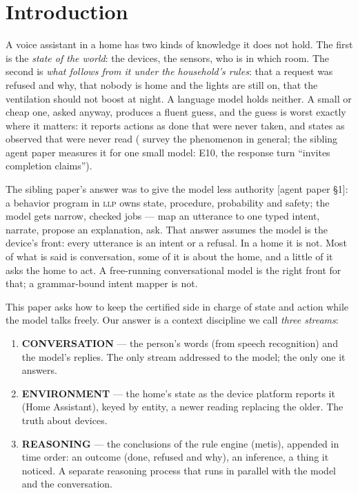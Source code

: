 \documentclass[11pt]{article}
\newcommand{\llp}{\textsc{llp}}
\newcommand{\src}[1]{{\footnotesize\textsf{[#1]}}}
\begin{document}
\section{Introduction}\label{sec:intro}

A voice assistant in a home has two kinds of knowledge it does not hold. The first is the
\emph{state of the world}: the devices, the sensors, who is in which room. The second is
\emph{what follows from it under the household's rules}: that a request was refused and why,
that nobody is home and the lights are still on, that the ventilation should not boost at
night. A language model holds neither. A small or cheap one, asked anyway, produces a
fluent guess, and the guess is worst exactly where it matters: it reports actions as done
that were never taken, and states as observed that were never read
(\cite{ji2023survey} survey the phenomenon in general; the sibling agent paper measures it
for one small model: E10, the response turn ``invites completion claims'').

The sibling paper's answer was to give the model less authority \src{agent paper
\S1}: a behavior program in \llp{} owns state, procedure, probability and safety; the model
gets narrow, checked jobs --- map an utterance to one typed intent, narrate, propose an
explanation, ask. That answer assumes the model is the device's front: every utterance is
an intent or a refusal. In a home it is not. Most of what is said is conversation, some of
it is about the home, and a little of it asks the home to act. A free-running conversational
model is the right front for that; a grammar-bound intent mapper is not.

This paper asks how to keep the certified side in charge of state and action while the model
talks freely. Our answer is a context discipline we call \emph{three streams}:

\begin{enumerate}[nosep]
\item \textbf{CONVERSATION} --- the person's words (from speech recognition) and the model's
replies. The only stream addressed to the model; the only one it answers.
\item \textbf{ENVIRONMENT} --- the home's state as the device platform reports it (Home
Assistant), keyed by entity, a newer reading replacing the older. The truth about devices.
\item \textbf{REASONING} --- the conclusions of the rule engine (metis), appended in time
order: an outcome (done, refused and why), an inference, a thing it noticed. A separate
reasoning process that runs in parallel with the model and the conversation.
\end{enumerate}
\end{document}

